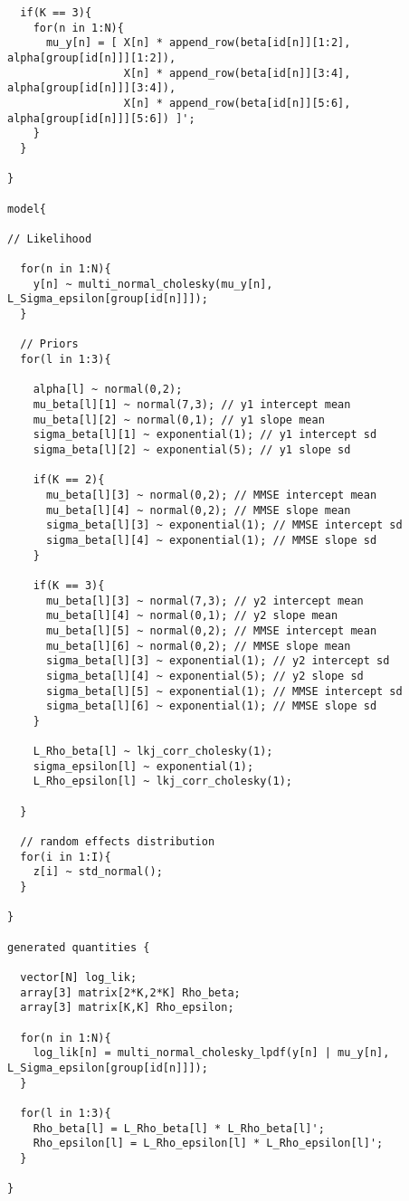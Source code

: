 \documentclass[12pt]{article}
\begin{document}
\begin{verbatim}
  if(K == 3){
    for(n in 1:N){
      mu_y[n] = [ X[n] * append_row(beta[id[n]][1:2], alpha[group[id[n]]][1:2]),
                  X[n] * append_row(beta[id[n]][3:4], alpha[group[id[n]]][3:4]),
                  X[n] * append_row(beta[id[n]][5:6], alpha[group[id[n]]][5:6]) ]';
    }
  }
  
}

model{

// Likelihood

  for(n in 1:N){
    y[n] ~ multi_normal_cholesky(mu_y[n], L_Sigma_epsilon[group[id[n]]]);
  }

  // Priors
  for(l in 1:3){
    
    alpha[l] ~ normal(0,2); 
    mu_beta[l][1] ~ normal(7,3); // y1 intercept mean
    mu_beta[l][2] ~ normal(0,1); // y1 slope mean
    sigma_beta[l][1] ~ exponential(1); // y1 intercept sd
    sigma_beta[l][2] ~ exponential(5); // y1 slope sd
    
    if(K == 2){
      mu_beta[l][3] ~ normal(0,2); // MMSE intercept mean
      mu_beta[l][4] ~ normal(0,2); // MMSE slope mean
      sigma_beta[l][3] ~ exponential(1); // MMSE intercept sd
      sigma_beta[l][4] ~ exponential(1); // MMSE slope sd
    }
    
    if(K == 3){
      mu_beta[l][3] ~ normal(7,3); // y2 intercept mean
      mu_beta[l][4] ~ normal(0,1); // y2 slope mean
      mu_beta[l][5] ~ normal(0,2); // MMSE intercept mean
      mu_beta[l][6] ~ normal(0,2); // MMSE slope mean
      sigma_beta[l][3] ~ exponential(1); // y2 intercept sd
      sigma_beta[l][4] ~ exponential(5); // y2 slope sd  
      sigma_beta[l][5] ~ exponential(1); // MMSE intercept sd
      sigma_beta[l][6] ~ exponential(1); // MMSE slope sd
    }
    
    L_Rho_beta[l] ~ lkj_corr_cholesky(1);
    sigma_epsilon[l] ~ exponential(1);
    L_Rho_epsilon[l] ~ lkj_corr_cholesky(1);
    
  }
  
  // random effects distribution
  for(i in 1:I){
    z[i] ~ std_normal();
  }
  
}

generated quantities {

  vector[N] log_lik;
  array[3] matrix[2*K,2*K] Rho_beta;
  array[3] matrix[K,K] Rho_epsilon;

  for(n in 1:N){
    log_lik[n] = multi_normal_cholesky_lpdf(y[n] | mu_y[n], L_Sigma_epsilon[group[id[n]]]);
  }

  for(l in 1:3){
    Rho_beta[l] = L_Rho_beta[l] * L_Rho_beta[l]';
    Rho_epsilon[l] = L_Rho_epsilon[l] * L_Rho_epsilon[l]';  
  }

}
\end{verbatim}
\end{document}
